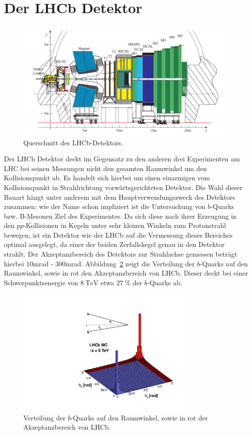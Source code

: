 \section{Der LHCb Detektor}
%
\begin{figure}[H]
  \centering
      \includegraphics[width=\textwidth]{Plots/lhcb.pdf}
  \caption{Querschnitt des LHCb-Detektors.\cite{lhcb}}
  \label{fig:lhcb}
\end{figure}
%
Der LHCb Detektor deckt im Gegensatz zu den anderen drei Experimenten am LHC bei seinen Messungen nicht den gesamten Raumwinkel um den Kollisionspunkt ab. Es handelt sich hierbei um einen einarmigen vom Kollisionspunkt in Strahlrichtung vorwärtsgerichteten Detektor. Die Wahl dieser Bauart hängt unter anderem mit dem Hauptverwendungszweck des Detektors zusammen: wie der Name schon impliziert ist die Untersuchung von $b$-Quarks bzw. B-Mesonen Ziel des Experimentes. Da sich diese nach ihrer Erzeugung in den $pp$-Kollisionen in Kegeln unter sehr kleinen Winkeln zum Protonstrahl bewegen, ist ein Detektor wie der LHCb auf die Vermessung dieses Bereiches optimal ausgelegt, da einer der beiden Zerfallskegel genau in den Detektor strahlt. Der Akzeptanzbereich des Detektors zur Strahlachse gemessen beträgt hierbei $10$mrad - $300$mrad. Abbildung~\ref{fig:lhcb_angle} zeigt die Verteilung der $b$-Quarks auf den Raumwinkel, sowie in rot den Akzeptanzbereich von LHCb. Dieser deckt bei einer Schwerpunktsenergie von $\SI{8}{\tera\electronvolt}$ etwa $\SI{27}{\percent}$ der $b$-Quarks ab\cite{rad}.\\
%
\begin{figure}[H]
  \centering
      \includegraphics[width=0.8\textwidth]{Plots/08_rad_acc_scheme_left.pdf}
  \caption{Verteilung der $b$-Quarks auf den Raumwinkel, sowie in rot der Akzeptanzbereich von LHCb\cite{rad_pic}.}
  \label{fig:lhcb_angle}
\end{figure}
